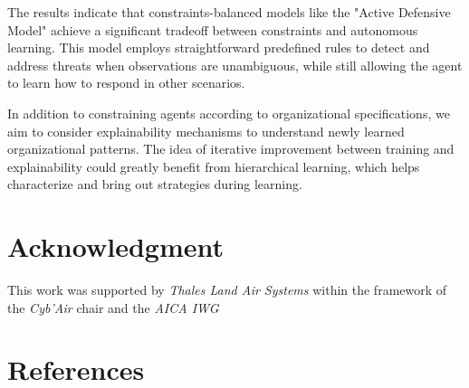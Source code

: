 \documentclass[conference]{IEEEtran}
\begin{document}
The results indicate that constraints-balanced models like the "Active Defensive Model" achieve a significant tradeoff between constraints and autonomous learning. This model employs straightforward predefined rules to detect and address threats when observations are unambiguous, while still allowing the agent to learn how to respond in other scenarios.

In addition to constraining agents according to organizational specifications, we aim to consider explainability mechanisms to understand newly learned organizational patterns. The idea of iterative improvement between training and explainability could greatly benefit from hierarchical learning, which helps characterize and bring out strategies during learning.




\section*{Acknowledgment}

This work was supported by \emph{Thales Land Air Systems} within the framework of the \emph{Cyb'Air} chair and the \emph{AICA IWG}

\section*{References}

% 



\end{document}
